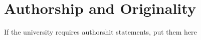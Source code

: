 \chapter{Authorship and Originality}

If the university requires authorshit statements, put them here